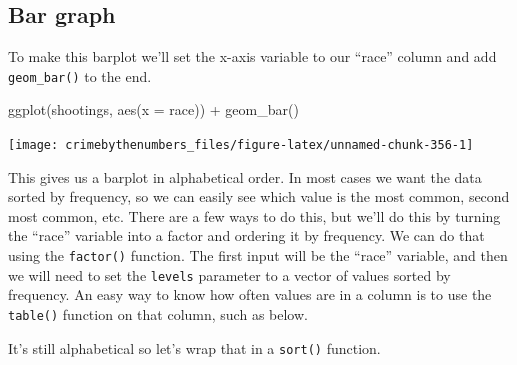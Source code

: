 \documentclass[
]{krantz}
\makeatletter
\newenvironment{Shaded}{\begin{snugshade}}{\end{snugshade}}
\newcommand{\AttributeTok}[1]{\textcolor[rgb]{0.61,0.61,0.61}{#1}}
\newcommand{\CommentTok}[1]{\textcolor[rgb]{0.37,0.37,0.37}{\textit{#1}}}
\newcommand{\FunctionTok}[1]{\textcolor[rgb]{0,0,0}{#1}}
\newcommand{\NormalTok}[1]{#1}
\newcommand{\SpecialCharTok}[1]{\textcolor[rgb]{0,0,0}{#1}}
\newenvironment{kframe}{%
\medskip{}
\setlength{\fboxsep}{.8em}
 \def\at@end@of@kframe{}%
 \ifinner\ifhmode%
  \def\at@end@of@kframe{\end{minipage}}%
  \begin{minipage}{\columnwidth}%
 \fi\fi%
 \def\FrameCommand##1{\hskip\@totalleftmargin \hskip-\fboxsep
 \colorbox{shadecolor}{##1}\hskip-\fboxsep
     \hskip-\linewidth \hskip-\@totalleftmargin \hskip\columnwidth}%
 \MakeFramed {\advance\hsize-\width
   \@totalleftmargin\z@ \linewidth\hsize
   \@setminipage}}%
 {\par\unskip\endMakeFramed%
 \at@end@of@kframe}
\renewenvironment{Shaded}{\begin{kframe}}{\end{kframe}}
\makeatother
\begin{document}
\hypertarget{bar-graph}{%
\subsection{Bar graph}\label{bar-graph}}

To make this barplot we'll set the x-axis variable to our
``race'' column and add \texttt{geom\_bar()} to the end.

\begin{Shaded}
\begin{Highlighting}[]
\FunctionTok{ggplot}\NormalTok{(shootings, }\FunctionTok{aes}\NormalTok{(}\AttributeTok{x =}\NormalTok{ race)) }\SpecialCharTok{+}
  \FunctionTok{geom\_bar}\NormalTok{()}
\end{Highlighting}
\end{Shaded}

\begin{center}\texttt{[image: crimebythenumbers\_files/figure-latex/unnamed-chunk-356-1]} \end{center}

This gives us a barplot in alphabetical order. In most cases
we want the data sorted by frequency, so we can easily see
which value is the most common, second most common, etc.
There are a few ways to do this, but we'll do this by
turning the ``race'' variable into a factor and ordering it
by frequency. We can do that using the \texttt{factor()}
function. The first input will be the ``race'' variable, and
then we will need to set the \texttt{levels} parameter to a
vector of values sorted by frequency. An easy way to know
how often values are in a column is to use the
\texttt{table()} function on that column, such as below.

\begin{Shaded}
\end{Shaded}

It's still alphabetical so let's wrap that in a
\texttt{sort()} function.

\begin{Shaded}
\end{Shaded}
\end{document}
